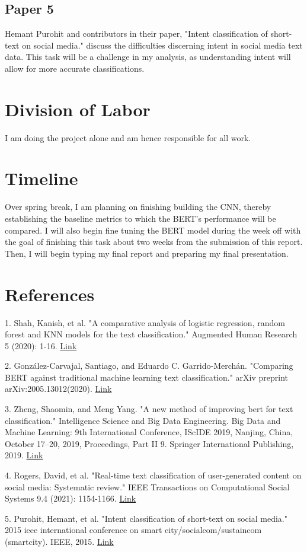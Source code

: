 \documentclass[11pt,a4paper]{article}
\begin{document}
\subsection{Paper 5}

Hemant Purohit and contributors in their paper, "Intent classification of short-text on social media." discuss the difficulties discerning intent in social media text data. This task will be a challenge in my analysis, as understanding intent will allow for more accurate classifications.

\section{Division of Labor}

I am doing the project alone and am hence responsible for all work.

\section{Timeline}

Over spring break, I am planning on finishing building the CNN, thereby establishing the baseline metrics to which the BERT’s performance will be compared. I will also begin fine tuning the BERT model during the week off with the goal of finishing this task about two weeks from the submission of this report. Then, I will begin typing my final report and preparing my final presentation.

\section{References}



1. Shah, Kanish, et al. "A comparative analysis of logistic regression, random forest and KNN models for the text classification." Augmented Human Research 5 (2020): 1-16. \href{https://link.springer.com/article/10.1007/s41133-020-00032-0}{Link}


2. González-Carvajal, Santiago, and Eduardo C. Garrido-Merchán. "Comparing BERT against traditional machine learning text classification." arXiv preprint arXiv:2005.13012(2020). \href{https://arxiv.org/abs/2005.13012}{Link}


3. Zheng, Shaomin, and Meng Yang. "A new method of improving bert for text classification." Intelligence Science and Big Data Engineering. Big Data and Machine Learning: 9th International Conference, IScIDE 2019, Nanjing, China, October 17–20, 2019, Proceedings, Part II 9. Springer International Publishing, 2019. \href{https://link.springer.com/chapter/10.1007/978-3-030-36204-1_37}{Link}


4. Rogers, David, et al. "Real-time text classification of user-generated content on social media: Systematic review." IEEE Transactions on Computational Social Systems 9.4 (2021): 1154-1166. \href{https://ieeexplore.ieee.org/abstract/document/9585425}{Link}


5. Purohit, Hemant, et al. "Intent classification of short-text on social media." 2015 ieee international conference on smart city/socialcom/sustaincom (smartcity). IEEE, 2015. \href{https://ieeexplore.ieee.org/abstract/document/7463729}{Link}
\end{document}
